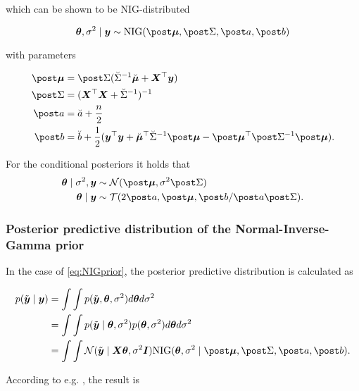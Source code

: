 which can be shown to be NIG-distributed

\begin{equation*}
    \btheta, \ssd \mid \by \sim \text{NIG}(\mupo, \Sdpo, \apo, \bpo)
\end{equation*}

with parameters

\begin{equation*}
    \begin{aligned}
        \mupo &= \Sdpo (\Sdipri \mupri + \bX^\top \by) \\
        \Sdpo &= (\bX^\top \bX + \Sdipri)^{-1} \\
        \apo &= \apri + \frac{n}{2}\\
        \bpo &= \bpri + \frac{1}{2} ( \by^\top \by + \mupri^\top \Sdipri \mupo - \mupo^\top \Sdipo \mupo).
    \end{aligned}
\end{equation*}

For the conditional posteriors it holds that
\begin{equation*}
    \begin{aligned}
        \btheta \mid \ssd, \by &\sim \Ncal(\mupo, \ssd \Sdpo) \\
        \btheta \mid \by &\sim \Tcal(2 \apo, \mupo, \bpo / \apo \Sdpo).
    \end{aligned}
\end{equation*}

\subsubsection*{Posterior predictive distribution of the Normal-Inverse-Gamma prior}

In the case of \eqref{eq:NIGprior}, the posterior predictive distribution is calculated as 

\begin{equation*}
    \begin{aligned}
        p(\ty \mid \by) 
        &= \int \int p(\ty, \btheta, \ssd) d \btheta d \ssd \\
        &= \int \int p(\ty \mid \btheta, \ssd) p(\btheta, \ssd) d \btheta d \ssd \\
        &= \int \int \Ncal(\ty \mid \bX \btheta, \ssd \bI) \text{NIG}(\btheta, \ssd \mid \mupo, \Sdpo, \apo, \bpo).
    \end{aligned}
\end{equation*}

According to e.g. \citet{murphy_conjugate_nodate}, the result is

